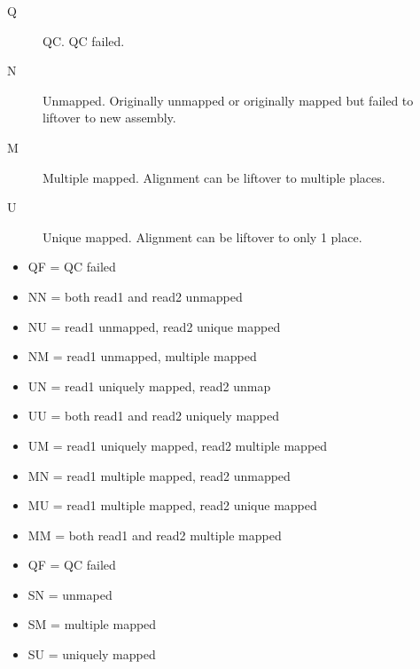 \documentclass[letterpaper,10pt,english]{sphinxmanual}
\begin{document}
\begin{description}
\item[{Q}] \leavevmode
QC. QC failed.

\item[{N}] \leavevmode
Unmapped. Originally unmapped or originally mapped but failed to liftover to new assembly.

\item[{M}] \leavevmode
Multiple mapped. Alignment can be liftover to multiple places.

\item[{U}] \leavevmode
Unique mapped. Alignment can be liftover to only 1 place.

\end{description}

\begin{itemize}
\item {} 
QF = QC failed

\item {} 
NN = both read1 and read2 unmapped

\item {} 
NU = read1 unmapped, read2 unique mapped

\item {} 
NM = read1 unmapped, multiple mapped

\item {} 
UN = read1 uniquely mapped, read2 unmap

\item {} 
UU = both read1 and read2 uniquely mapped

\item {} 
UM = read1 uniquely mapped, read2 multiple mapped

\item {} 
MN = read1 multiple mapped, read2 unmapped

\item {} 
MU = read1 multiple mapped, read2 unique mapped

\item {} 
MM = both read1 and read2 multiple mapped

\end{itemize}

\begin{itemize}
\item {} 
QF = QC failed

\item {} 
SN = unmaped

\item {} 
SM = multiple mapped

\item {} 
SU = uniquely mapped

\end{itemize}
\end{document}
